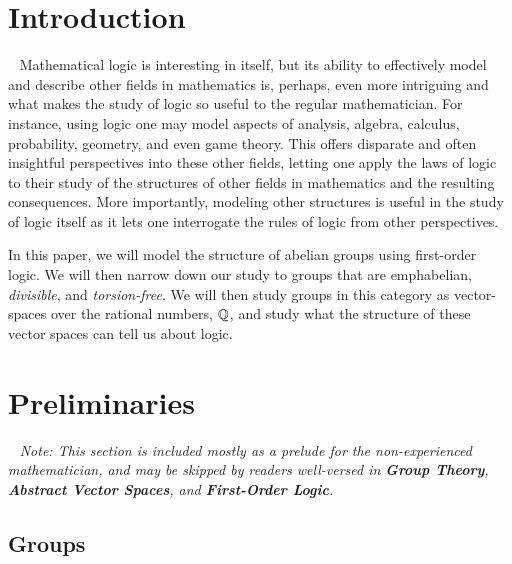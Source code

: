 \section{Introduction}~\label{sec:prelims}
Mathematical logic is interesting in itself, but
its ability to effectively model and describe other
fields in mathematics is, perhaps, even more intriguing
and what makes the study of logic so useful to the regular
mathematician.
For instance, using logic one may model aspects of
analysis, algebra, calculus, probability, geometry,
and even game theory.
This offers disparate and often insightful perspectives into these other fields,
letting one apply the laws of logic to their study of the structures
of other fields in mathematics and the resulting consequences.
More importantly, modeling other structures is useful in the study of logic
itself as it lets one interrogate the rules of logic from other perspectives.

In this paper, we will model the structure of abelian groups using
first-order logic. We will then narrow down our study to groups that
are emph{abelian}, \emph{divisible}, and \emph{torsion-free}.
We will then study groups in this category as vector-spaces
over the rational numbers, $\mathbb{Q}$, and study what the structure of these
vector spaces can tell us about logic.











\newpage
\section{Preliminaries}~\label{sec:preliminaries}
\emph{
  Note: This section is included mostly as a prelude for the
  non-experienced mathematician, and may be skipped by readers
  well-versed in
  \textbf{Group Theory},
  \textbf{Abstract Vector Spaces},
  and \textbf{First-Order Logic}.
}

\subsection{Groups}~\label{sec:def-groups}

